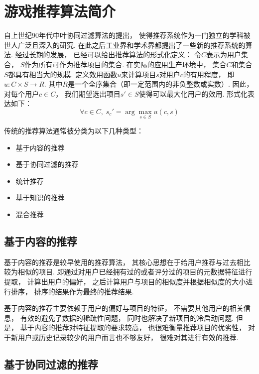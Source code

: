 \section{游戏推荐算法简介}

自上世纪90年代中叶协同过滤算法的提出\cite{adomaviciusNextGenerationRecommender2005}，
使得推荐系统作为一门独立的学科被世人广泛且深入的研究.
在此之后工业界和学术界都提出了一些新的推荐系统的算法.
经过长期的发展，
已经可以给出推荐算法的形式化定义：
令$C$表示为用户集合，
$S$作为所有可作为推荐项目的集合.
在实际的应用生产环境中，
集合$C$和集合$S$都具有相当大的规模.
定义效用函数$u$来计算项目$s$对用户$c$的有用程度，
即$u:C\times S\rightarrow R$.
其中$R$是一个全序集合（即一定范围内的非负整数或实数）.
因此，
对每个用户$c\in C$，
我们期望选出项目$s'\in S$使得可以最大化用户的效用.
形式化表达如下：
\begin{equation}
    \forall c\in C,\; s_c'=\arg \max_{s\in S} u(c,s)
\end{equation}

传统的推荐算法通常被分类为以下几种类型\cite{canoHybridRecommenderSystems2017}：
\begin{itemize}
    \item 基于内容的推荐
    \item 基于协同过滤的推荐
    \item 统计推荐
    \item 基于知识的推荐
    \item 混合推荐
\end{itemize}

\subsection{基于内容的推荐}

基于内容的推荐是较早使用的推荐算法，
其核心思想在于给用户推荐与过去相比较为相似的项目.
即通过对用户已经拥有过的或者评分过的项目的元数据特征进行提取，
计算出用户的偏好，
之后计算用户与项目的相似度并根据相似度的大小进行排序，
排序的结果作为最终的推荐结果.

基于内容的推荐主要依赖于用户的偏好与项目的特征，
不需要其他用户的相关信息，
有效的避免了数据的稀疏性问题，
同时也解决了新项目的冷启动问题.
但是，
基于内容的推荐对特征提取的要求较高，
也很难衡量推荐项目的优劣性，
对于新用户或历史记录较少的用户而言也不够友好，
很难对其进行有效的推荐.

\subsection{基于协同过滤的推荐}

